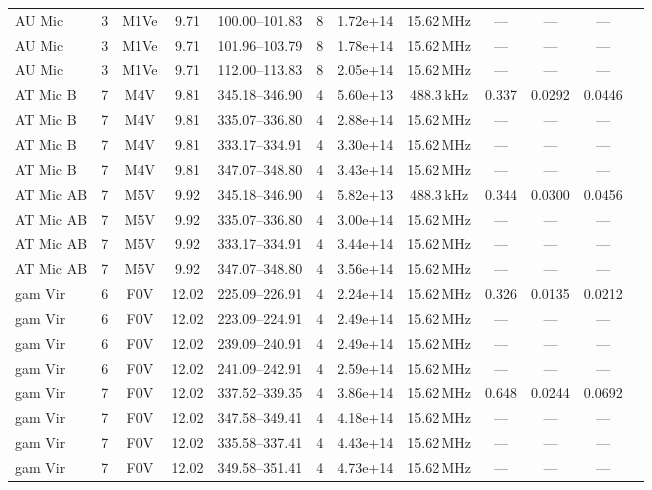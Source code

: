 \documentclass{openjournal}
\begin{document}
\begin{table}
\begin{tabularx}{\textwidth}{@{}l c c c c c c c c c c X@{}}
 AU Mic & 3 & M1Ve & 9.71 & 100.00--101.83 & 8 & 1.72e+14 & 15.62\,MHz & --- & --- & --- &  \\
 AU Mic & 3 & M1Ve & 9.71 & 101.96--103.79 & 8 & 1.78e+14 & 15.62\,MHz & --- & --- & --- &  \\
 AU Mic & 3 & M1Ve & 9.71 & 112.00--113.83 & 8 & 2.05e+14 & 15.62\,MHz & --- & --- & --- &  \\
 AT Mic B & 7 & M4V & 9.81 & 345.18--346.90 & 4 & 5.60e+13 & 488.3\,kHz & 0.337 & 0.0292 & 0.0446 &  \\
 AT Mic B & 7 & M4V & 9.81 & 335.07--336.80 & 4 & 2.88e+14 & 15.62\,MHz & --- & --- & --- &  \\
 AT Mic B & 7 & M4V & 9.81 & 333.17--334.91 & 4 & 3.30e+14 & 15.62\,MHz & --- & --- & --- &  \\
 AT Mic B & 7 & M4V & 9.81 & 347.07--348.80 & 4 & 3.43e+14 & 15.62\,MHz & --- & --- & --- &  \\
 AT Mic AB & 7 & M5V & 9.92 & 345.18--346.90 & 4 & 5.82e+13 & 488.3\,kHz & 0.344 & 0.0300 & 0.0456 &  \\
 AT Mic AB & 7 & M5V & 9.92 & 335.07--336.80 & 4 & 3.00e+14 & 15.62\,MHz & --- & --- & --- &  \\
 AT Mic AB & 7 & M5V & 9.92 & 333.17--334.91 & 4 & 3.44e+14 & 15.62\,MHz & --- & --- & --- &  \\
 AT Mic AB & 7 & M5V & 9.92 & 347.07--348.80 & 4 & 3.56e+14 & 15.62\,MHz & --- & --- & --- &  \\
 gam Vir & 6 & F0V & 12.02 & 225.09--226.91 & 4 & 2.24e+14 & 15.62\,MHz & 0.326 & 0.0135 & 0.0212 &  \\
 gam Vir & 6 & F0V & 12.02 & 223.09--224.91 & 4 & 2.49e+14 & 15.62\,MHz & --- & --- & --- &  \\
 gam Vir & 6 & F0V & 12.02 & 239.09--240.91 & 4 & 2.49e+14 & 15.62\,MHz & --- & --- & --- &  \\
 gam Vir & 6 & F0V & 12.02 & 241.09--242.91 & 4 & 2.59e+14 & 15.62\,MHz & --- & --- & --- &  \\
 gam Vir & 7 & F0V & 12.02 & 337.52--339.35 & 4 & 3.86e+14 & 15.62\,MHz & 0.648 & 0.0244 & 0.0692 &  \\
 gam Vir & 7 & F0V & 12.02 & 347.58--349.41 & 4 & 4.18e+14 & 15.62\,MHz & --- & --- & --- &  \\
 gam Vir & 7 & F0V & 12.02 & 335.58--337.41 & 4 & 4.43e+14 & 15.62\,MHz & --- & --- & --- &  \\
 gam Vir & 7 & F0V & 12.02 & 349.58--351.41 & 4 & 4.73e+14 & 15.62\,MHz & --- & --- & --- &  \\
\hline
\end{tabularx}
\end{table}
\end{document}
